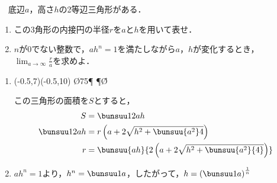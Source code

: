 \begin{problem}
  　底辺$a$，高さ$h$の2等辺三角形がある．
\begin{enumerate}
\item この3角形の内接円の半径$r$を$a$と$h$を用いて表せ．
\item $n$が0でない整数で，$ah^n=1$を満たしながら$a$，$h$が変化するとき，
$\displaystyle\lim_{a\to\infty}\frac{r}{a}$を求めよ．
\end{enumerate}
\end{problem}

\noindent\kaie

\begin{enumerate}
  \item
  \begin{mawarikomi}{}{
\begin{pszahyou*}[ul=4mm](-0.5,7)(-0.5,10)
  \kandk\O{75}\P
  \Suisen\P\O\A\H
  \Takakkei{\O\A\P}
  \Drawline{\P\H}
\end{pszahyou*}}
この三角形の面積を$S$とすると，
\begin{align*}
  S &= \bunsuu12ah \\
  \bunsuu12ah &= r\left(a + 2\sqrt{h^2 + \bunsuu{a^2}4}\right) \\
  r &= \bunsuu{ah}{2\left(a + 2\sqrt{h^2 + \bunsuu{a^2}{4}}\right)}
\end{align*}
\end{mawarikomi}

\item $ah^n = 1$より，$h^n = \bunsuu1a$，したがって，$h = \left(\bunsuu1a\right)^{\frac1{n}}$

\end{enumerate}
